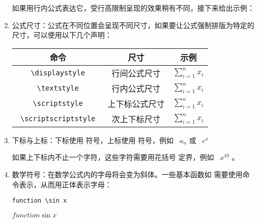 \begin{enumerate}
如果用行内公式表达它，受行高限制呈现的效果稍有不同，接下来给出示例：

\item 公式尺寸：公式在不同位置会呈现不同尺寸，如果要让公式强制排版为特定的尺寸，可以使用以下几个声明：

\begin{tcolorbox}[colback=white]
\begin{center}
\begin{tabular}{ccc}
    命令 & 尺寸 & 示例\\
\hline
    \verb| \displaystyle | & 行间公式尺寸 & $\displaystyle{\sum_{i=1}^{n}x_i}$\\
    \verb| \textstyle | & 行内公式尺寸 & $\textstyle{\sum_{i=1}^{n}x_i}$\\
    \verb| \scriptstyle | & 上下标公式尺寸 & $\scriptstyle{\sum_{i=1}^{n}x_i}$\\
    \verb| \scriptscriptstyle | & 次上下标尺寸 & $\scriptscriptstyle{\sum_{i=1}^{n}x_i}$\\
\end{tabular}
\end{center}
\end{tcolorbox}

\item 下标与上标：下标使用 \boxforcmd{_} 符号，上标使用 \boxforcmd{^} 符号，例如  \, $a_n$ 或  \, $e^x$ 


如果上下标内不止一个字符，这些字符需要用花括号 \boxforcmd{\{\}} 定界，例如  \, $ x^{10} $ 。

\item 数学符号：在数学公式内的字母将会变为斜体。一些基本函数如 \boxforcmd{\\sin} 需要使用命令表示，从而用正体表示字母：

\begin{tcolorbox}[sidebyside]
\begin{lstlisting}
function \sin x
\end{lstlisting} 

\tcblower

$ function \sin x $
\end{tcolorbox}

\end{enumerate}
